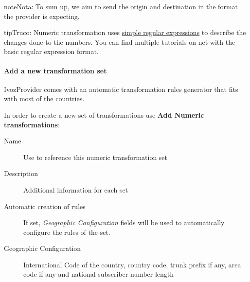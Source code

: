 \documentclass[letterpaper,10pt,spanish]{sphinxmanual}
\begin{document}
\begin{notice}{note}{Nota:}
To sum up, we aim to send the origin and destination in the format the
provider is expecting.
\end{notice}

\begin{notice}{tip}{Truco:}
Numeric transformation uses \href{https://es.wikipedia.org/wiki/Expresi\%C3\%B3n\_regular}{simple regular expressions} to describe the
changes done to the numbers. You can find multiple tutorials on net with the
basic regular expression format.
\end{notice}


\paragraph{Add a new transformation set}
\label{administration_portal/brand/settings/numeric_transformations:add-a-new-transformation-set}
IvozProvider comes with an automatic transformation rules generator that fits
with most of the countries.

In order to create a new set of transformations use \textbf{Add Numeric transformations}:
\begin{description}
\item[{Name}] \leavevmode{}\label{administration_portal/brand/settings/numeric_transformations:term-name}
Use to reference this numeric transformation set

\item[{Description}] \leavevmode{}\label{administration_portal/brand/settings/numeric_transformations:term-description}
Additional information for each set

\item[{Automatic creation of rules}] \leavevmode{}\label{administration_portal/brand/settings/numeric_transformations:term-automatic-creation-of-rules}
If set, \emph{Geographic Configuration} fields will be used to automatically configure the rules of the set.

\item[{Geographic Configuration}] \leavevmode{}\label{administration_portal/brand/settings/numeric_transformations:term-geographic-configuration}
International Code of the country, country code, trunk prefix if any, area code if any and national subscriber
number length

\end{description}
\end{document}
